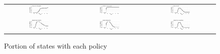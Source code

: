 \documentclass[3p, longtitle]{elsarticle}
\theoremstyle{definition}
\begin{document}
\begin{figure}[ht]\caption{Portion of states with each
    policy \label{fig:policyportion}}
  \begin{minipage}{\linewidth}
    \begin{tabular}{ccc}
      \includegraphics[width=0.31\textwidth]{tables_and_figures/pmaskbus_p}
      &
        \includegraphics[width=0.31\textwidth]{tables_and_figures/pk12_p}
      &
        \includegraphics[width=0.31\textwidth]{tables_and_figures/pshelter_p}
      \\
      \includegraphics[width=0.31\textwidth]{tables_and_figures/pmovie_p}
      &
        \includegraphics[width=0.31\textwidth]{tables_and_figures/prestaurant_p}
      &
        \includegraphics[width=0.31\textwidth]{tables_and_figures/pnonessential_p}
    \end{tabular}
  \end{minipage}
\end{figure}
\end{document}
